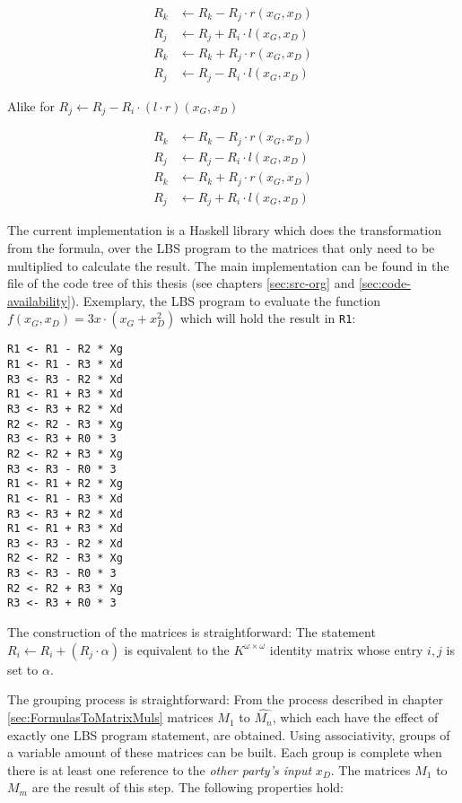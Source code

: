 \begin{align*}
R_k & \leftarrow R_k - R_j \cdot r(x_G, x_D) \\
R_j & \leftarrow R_j + R_i \cdot l(x_G, x_D) \\
R_k & \leftarrow R_k + R_j \cdot r(x_G, x_D) \\
R_j & \leftarrow R_j - R_i \cdot l(x_G, x_D)
\end{align*}

Alike for $R_j \leftarrow R_j - R_i \cdot (l \cdot r)(x_G, x_D)$

\begin{align*}
R_k & \leftarrow R_k - R_j \cdot r(x_G, x_D) \\
R_j & \leftarrow R_j - R_i \cdot l(x_G, x_D) \\
R_k & \leftarrow R_k + R_j \cdot r(x_G, x_D) \\
R_j & \leftarrow R_j + R_i \cdot l(x_G, x_D)
\end{align*}



The current implementation is a Haskell library which does the transformation
from the formula, over the LBS program to the matrices that only need to be
multiplied to calculate the result. The main implementation can be
found in the file  of the code tree of this thesis (see
chapters \ref{sec:src-org} and \ref{sec:code-availability}). Exemplary, the LBS
program to evaluate the function $f(x_G,x_D) = 3x \cdot (x_G + x_D^2)$ which
will hold the result in \texttt{R1}:

\begin{lstlisting}
R1 <- R1 - R2 * Xg
R1 <- R1 - R3 * Xd
R3 <- R3 - R2 * Xd
R1 <- R1 + R3 * Xd
R3 <- R3 + R2 * Xd
R2 <- R2 - R3 * Xg
R3 <- R3 + R0 * 3
R2 <- R2 + R3 * Xg
R3 <- R3 - R0 * 3
R1 <- R1 + R2 * Xg
R1 <- R1 - R3 * Xd
R3 <- R3 + R2 * Xd
R1 <- R1 + R3 * Xd
R3 <- R3 - R2 * Xd
R2 <- R2 - R3 * Xg
R3 <- R3 - R0 * 3
R2 <- R2 + R3 * Xg
R3 <- R3 + R0 * 3
\end{lstlisting}

\noindent{}The construction of the matrices is straightforward: The statement
$R_i \leftarrow R_i + (R_j \cdot \alpha)$ is equivalent to the $K^{\omega \times
\omega}$ identity matrix whose entry $i,j$ is set to $\alpha$.


\label{sec:matrix-grouping}

The grouping process is straightforward: From the process described in chapter
\ref{sec:FormulasToMatrixMuls} matrices $\widehat{M_1}$ to $\widehat{M_n}$,
which each have the effect of exactly one LBS program statement, are obtained.
Using associativity, groups of a variable amount of these matrices can be built.
Each group is complete when there is at least one reference to the \emph{other
party's input} $x_D$. The matrices $M_1$ to $M_m$ are the result of this step.
The following properties hold:

